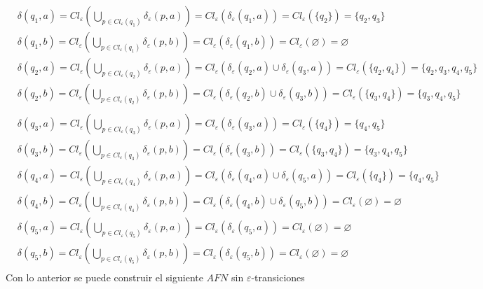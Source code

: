 \documentclass{article}
\begin{document}
\begin{enumerate}
\begin{enumerate}
        
        \begin{align*}
        &\delta(q_1, a) = Cl_{\varepsilon}(\bigcup_{p \in Cl_{\varepsilon}(q_1)} \delta_{\varepsilon}(p,a)) = Cl_\varepsilon(\delta_\varepsilon(q_1,a)) = Cl_\varepsilon(\{q_2\}) = \{q_2, q_3\} \\
        &\delta(q_1, b) = Cl_{\varepsilon}(\bigcup_{p \in Cl_{\varepsilon}(q_1)} \delta_{\varepsilon}(p,b)) = Cl_\varepsilon(\delta_\varepsilon(q_1,b)) = Cl_\varepsilon(\varnothing) = \varnothing \\
        &\delta(q_2, a) = Cl_{\varepsilon}(\bigcup_{p \in Cl_{\varepsilon}(q_2)} \delta_{\varepsilon}(p,a)) = Cl_\varepsilon(\delta_\varepsilon(q_2,a)\cup \delta_\varepsilon(q_3, a)) = Cl_\varepsilon(\{q_2,q_4\}) = \{q_2, q_3, q_4, q_5\} \\
        &\delta(q_2, b) = Cl_{\varepsilon}(\bigcup_{p \in Cl_{\varepsilon}(q_2)} \delta_{\varepsilon}(p,b)) = Cl_\varepsilon(\delta_\varepsilon(q_2,b)\cup \delta_\varepsilon(q_3, b)) = Cl_\varepsilon(\{q_3,q_4\}) = \{q_3, q_4, q_5\} \\
        \end{align*}
        \begin{align*}
        &\delta(q_3, a) = Cl_{\varepsilon}(\bigcup_{p \in Cl_{\varepsilon}(q_3)} \delta_{\varepsilon}(p,a)) = Cl_\varepsilon(\delta_\varepsilon(q_3, a)) = Cl_\varepsilon(\{q_4\}) = \{q_4, q_5\} \\
        &\delta(q_3, b) = Cl_{\varepsilon}(\bigcup_{p \in Cl_{\varepsilon}(q_3)} \delta_{\varepsilon}(p,b)) = Cl_\varepsilon(\delta_\varepsilon(q_3, b)) = Cl_\varepsilon(\{q_3,q_4\}) = \{q_3,q_4, q_5\} \\
        &\delta(q_4, a) = Cl_{\varepsilon}(\bigcup_{p \in Cl_{\varepsilon}(q_4)} \delta_{\varepsilon}(p,a)) = Cl_\varepsilon(\delta_\varepsilon(q_4, a)\cup \delta_\varepsilon(q_5,a)) = Cl_\varepsilon(\{q_4\}) = \{q_4, q_5\} \\
        &\delta(q_4, b) = Cl_{\varepsilon}(\bigcup_{p \in Cl_{\varepsilon}(q_4)} \delta_{\varepsilon}(p,b)) = Cl_\varepsilon(\delta_\varepsilon(q_4, b)\cup \delta_\varepsilon(q_5,b)) = Cl_\varepsilon(\varnothing) = \varnothing\\
        &\delta(q_5, a) = Cl_{\varepsilon}(\bigcup_{p \in Cl_{\varepsilon}(q_5)} \delta_{\varepsilon}(p,a)) = Cl_\varepsilon(\delta_\varepsilon(q_5,a)) = Cl_\varepsilon(\varnothing) = \varnothing \\
        &\delta(q_5, b) = Cl_{\varepsilon}(\bigcup_{p \in Cl_{\varepsilon}(q_5)} \delta_{\varepsilon}(p,b)) = Cl_\varepsilon(\delta_\varepsilon(q_5,b)) = Cl_\varepsilon(\varnothing) = \varnothing \\
        \end{align*}
        Con lo anterior se puede construir el siguiente $AFN$ sin $\varepsilon$-transiciones
        \begin{center}
\end{center}
\end{enumerate}
\end{enumerate}
\end{document}
